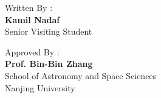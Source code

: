 \vspace{3 cm}

\noindent Written By :\\
\textbf{Kamil Nadaf} \\
Senior Visiting Student\\

\vspace{3 cm}

\noindent Approved By :\\
\textbf{Prof. Bin-Bin Zhang}\\
School of Astronomy and Space Sciences\\
Nanjing University



